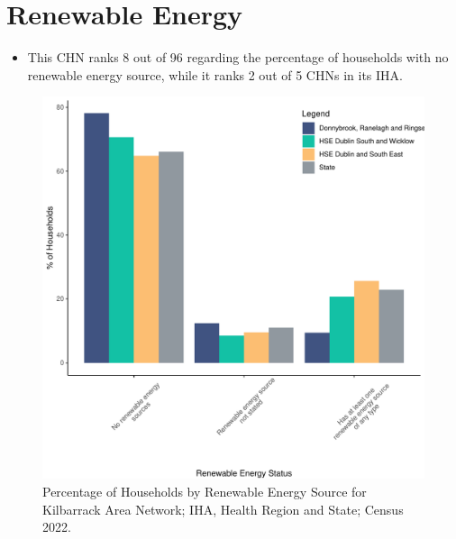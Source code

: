 \documentclass{article}
\begin{document}
\section{Renewable Energy}\label{sect:RE}
\begin{itemize}
\item This CHN ranks  8 out of 96 regarding the percentage of households with no renewable energy source, while it ranks   2 out of 5 CHNs in its IHA.
\end{itemize}
\begin{figure}[H]
	\centering
	\includegraphics[width = 140mm]{../figures/RenewableEnergyED.pdf}
	\caption{Percentage of Households by Renewable Energy Source for Kilbarrack Area Network; IHA, Health Region and State; Census 2022.}
	\label{fig:vbnv}
	\end{figure}
\end{document}
